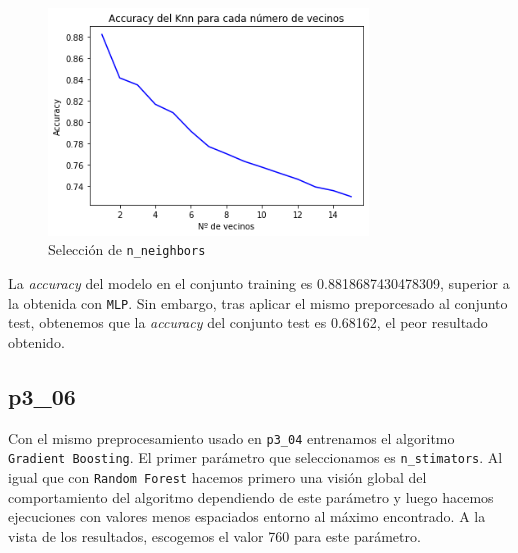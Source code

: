\documentclass[a4]{article}
\begin{document}
\begin{figure}[H]
  \centering
  \caption{Selección de \texttt{n\_neighbors}}
  \includegraphics[width=85mm]{imagenes/p3_05_vecinos}
\end{figure}

La \textit{accuracy} del modelo en el conjunto training es 0.8818687430478309, superior a la obtenida con \texttt{MLP}. Sin embargo, tras aplicar el mismo preporcesado al conjunto test, obtenemos que la \textit{accuracy} del conjunto test es 0.68162, el peor resultado obtenido.

\subsection{p3\_06}

Con el mismo preprocesamiento usado en \texttt{p3\_04} entrenamos el algoritmo \texttt{Gradient Boosting}. El primer parámetro que seleccionamos es \texttt{n\_stimators}. Al igual que con \texttt{Random Forest} hacemos primero una visión global del comportamiento del algoritmo dependiendo de este parámetro y luego hacemos ejecuciones con valores menos espaciados entorno al máximo encontrado. A la vista de los resultados, escogemos el valor 760 para este parámetro.
\end{document}
